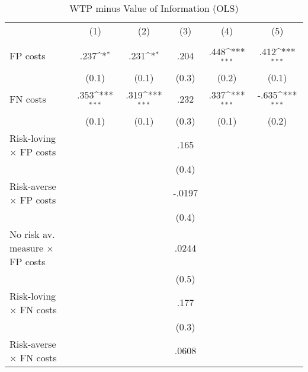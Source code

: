 \begin{table}[htbp]\centering
\def\sym#1{\ifmmode^{#1}\else\(^{#1}\)\fi}
\caption{WTP minus Value of Information (OLS)}
\begin{tabular}{l*{5}{c}}
\hline\hline
                &\multicolumn{1}{c}{(1)}&\multicolumn{1}{c}{(2)}&\multicolumn{1}{c}{(3)}&\multicolumn{1}{c}{(4)}&\multicolumn{1}{c}{(5)}\\
                &\multicolumn{1}{c}{}&\multicolumn{1}{c}{}&\multicolumn{1}{c}{}&\multicolumn{1}{c}{}&\multicolumn{1}{c}{}\\
\hline
FP costs        &     .237\sym{*}  &     .231\sym{*}  &     .204         &     .448\sym{***}&     .412\sym{***}\\
                &    (0.1)         &    (0.1)         &    (0.3)         &    (0.2)         &    (0.1)         \\
FN costs        &     .353\sym{***}&     .319\sym{***}&     .232         &     .337\sym{***}&    -.635\sym{***}\\
                &    (0.1)         &    (0.1)         &    (0.3)         &    (0.1)         &    (0.2)         \\
Risk-loving $\times$ FP costs&                  &                  &     .165         &                  &                  \\
                &                  &                  &    (0.4)         &                  &                  \\
Risk-averse $\times$ FP costs&                  &                  &   -.0197         &                  &                  \\
                &                  &                  &    (0.4)         &                  &                  \\
No risk av. measure $\times$ FP costs&                  &                  &    .0244         &                  &                  \\
                &                  &                  &    (0.5)         &                  &                  \\
Risk-loving $\times$ FN costs&                  &                  &     .177         &                  &                  \\
                &                  &                  &    (0.3)         &                  &                  \\
Risk-averse $\times$ FN costs&                  &                  &    .0608         &                  &                  \\

\end{tabular}
\end{table}
